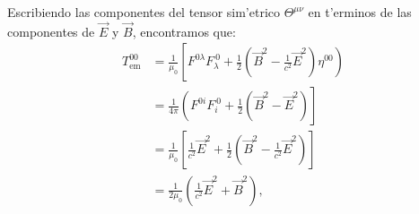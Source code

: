 Escribiendo las componentes del tensor sim'etrico $\Theta^{\mu\nu}$ en t'erminos
de las componentes de $\vec{E}$ y $\vec{B}$, encontramos que:
\begin{align}
T_\text{em}^{00}  & =\frac{1}{\mu_0}\left[F^{0\lambda}F_\lambda^{\ 0}+\frac
{1}{2}\left(\vec{B}^2-\frac{1}{c^2}\vec{E}^2\right) \eta^{00}\right) \\
& =\frac{1}{4\pi}\left(  F^{0i}F_i^{\ 0}+\frac{1}{2}\left(
\vec{B}^2-\vec{E}^2\right)\right] \\
& =\frac{1}{\mu_0}\left[\frac{1}{c^2}\vec{E}^2+\frac{1}{2}\left( \vec{B}^2-\frac{1}{c^2}\vec{E}^2\right)\right] \\
& =\frac{1}{2\mu_0}\left(\frac{1}{c^2}\vec{E}^2+\vec{B}^2\right),
\end{align}%
